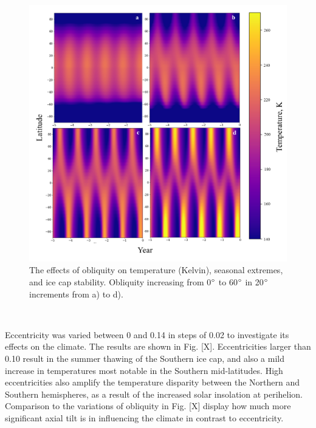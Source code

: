 \documentclass[12pt,onecolumn]{revtex4-2}    %
\begin{document}
\begin{figure}[h]
\centering
\includegraphics[width = 17cm]{obliquity_heatmaps_new.png}
\caption{The effects of obliquity on temperature (Kelvin), seasonal extremes, and ice cap stability. Obliquity increasing from 0$\degree$ to 60$\degree$ in 20$\degree$ increments from a) to d).}
\label{fig:test}
\end{figure}

\

Eccentricity was varied between 0 and 0.14 in steps of 0.02 to investigate its effects on the climate. The results are shown in Fig. [X]. Eccentricities larger than 0.10 result in the summer thawing of the Southern ice cap, and also a mild increase in temperatures most notable in the Southern mid-latitudes. High eccentricities also amplify the temperature disparity between the Northern and Southern hemispheres, as a result of the increased solar insolation at perihelion. Comparison to the variations of obliquity in Fig. [X] display how much more significant axial tilt is in influencing the climate in contrast to eccentricity.
\end{document}
